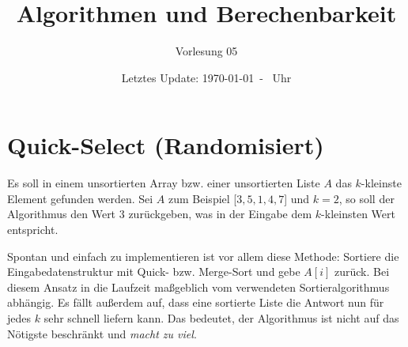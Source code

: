 \documentclass{scrartcl}%
\begin{document}
    \subject{Vorlesungsmitschrieb}
    \title{Algorithmen und Berechenbarkeit}
    \subtitle{Vorlesung 05}
    \date{Letztes Update: \today \ - \currenttime \ Uhr}
    \maketitle

    \section*{Quick-Select (Randomisiert)}\label{sec:quick-select}
    Es soll in einem unsortierten Array bzw. einer unsortierten Liste $A$ das $k$-kleinste Element gefunden werden.
    Sei $A$ zum Beispiel [$3,5,1,4,7$] und $k=2$, so soll der Algorithmus den Wert $3$ zurückgeben, was in der Eingabe dem $k$-kleinsten Wert entspricht.

    Spontan und einfach zu implementieren ist vor allem diese Methode: Sortiere die Eingabedatenstruktur mit Quick- bzw.
    Merge-Sort und gebe $A[i]$ zurück.
    Bei diesem Ansatz in die Laufzeit maßgeblich vom verwendeten Sortieralgorithmus abhängig.
    Es fällt außerdem auf, dass eine sortierte Liste die Antwort nun für jedes $k$ sehr schnell liefern kann.
    Das bedeutet, der Algorithmus ist nicht auf das Nötigste beschränkt und \textit{macht zu viel}.
\end{document}
